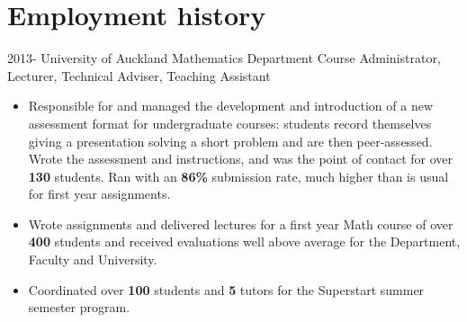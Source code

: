 \documentclass[hidelinks, 10pt]{article} %
\begin{document}

\section{Employment history}

\job
{2013-}{}
{University of Auckland Mathematics Department}
{}
{Course Administrator, Lecturer, Technical Adviser, Teaching Assistant}
{
    \begin{itemize}
        \item Responsible for and managed the development and introduction of a new assessment format for undergraduate courses: students record themselves giving a presentation solving a short problem and are then peer-assessed.
              Wrote the assessment and instructions, and was the point of contact for over \textbf{130} students.
              Ran with an \textbf{86\%} submission rate, much higher than is usual for first year assignments.

        \item Wrote assignments and delivered lectures for a first year Math course of over \textbf{400} students and received evaluations well above average for the Department, Faculty and University. 

        \item Coordinated over \textbf{100} students and \textbf{5} tutors for the Superstart summer semester program.

    \end{itemize}
}


\end{document}
